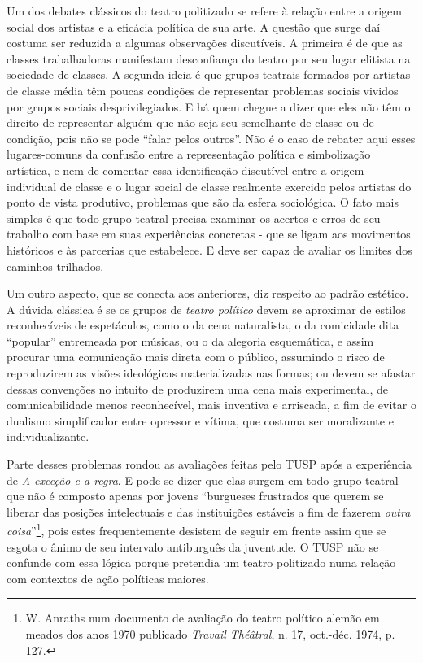 Um dos debates clássicos do teatro politizado se refere à relação entre
a origem social dos artistas e a eficácia política de sua arte. A
questão que surge daí costuma ser reduzida a algumas observações
discutíveis. A primeira é de que as classes trabalhadoras manifestam
desconfiança do teatro por seu lugar elitista na sociedade de classes. A
segunda ideia é que grupos teatrais formados por artistas de classe
média têm poucas condições de representar problemas sociais vividos por
grupos sociais desprivilegiados. E há quem chegue a dizer que eles não
têm o direito de representar alguém que não seja seu semelhante de
classe ou de condição, pois não se pode “falar pelos outros”. Não é o
caso de rebater aqui esses lugares-comuns da confusão entre a
representação política e simbolização artística, e nem de comentar essa
identificação discutível entre a origem individual de classe e o lugar
social de classe realmente exercido pelos artistas do ponto de vista
produtivo, problemas que são da esfera sociológica. O fato mais simples
é que todo grupo teatral precisa examinar os acertos e erros de seu
trabalho com base em suas experiências concretas - que se ligam aos
movimentos históricos e às parcerias que estabelece. E deve ser capaz de
avaliar os limites dos caminhos trilhados.

Um outro aspecto, que se conecta aos anteriores, diz respeito ao padrão
estético. A dúvida clássica é se os grupos de \textit{teatro político}
devem se aproximar de estilos reconhecíveis de espetáculos, como o da
cena naturalista, o da comicidade dita “popular” entremeada por músicas,
ou o da alegoria esquemática, e assim procurar uma comunicação mais
direta com o público, assumindo o risco de reproduzirem as visões
ideológicas materializadas nas formas; ou devem se afastar dessas
convenções no intuito de produzirem uma cena mais experimental, de
comunicabilidade menos reconhecível, mais inventiva e arriscada, a fim
de evitar o dualismo simplificador entre opressor e vítima, que costuma
ser moralizante e individualizante.

Parte desses problemas rondou as avaliações feitas pelo TUSP após a
experiência de \textit{A exceção e a regra}. E pode-se dizer que elas
surgem em todo grupo teatral que não é composto apenas por jovens
“burgueses frustrados que querem se liberar das posições intelectuais e
das instituições estáveis a fim de fazerem \textit{outra
coisa}”\footnote{W. Anraths num documento de avaliação do teatro
  político alemão em meados dos anos 1970 publicado \textit{Travail
  Théâtral}, n. 17, oct.-déc. 1974, p. 127.}, pois estes frequentemente
desistem de seguir em frente assim que se esgota o ânimo de seu
intervalo antiburguês da juventude. O TUSP não se confunde com essa
lógica porque pretendia um teatro politizado numa relação com contextos
de ação políticas maiores.

